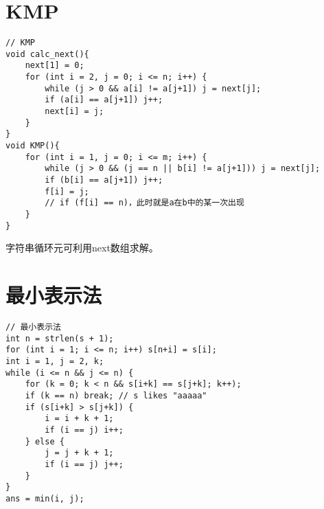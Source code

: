 \section{KMP}
\begin{lstlisting}
// KMP
void calc_next(){
    next[1] = 0;
    for (int i = 2, j = 0; i <= n; i++) {
        while (j > 0 && a[i] != a[j+1]) j = next[j];
        if (a[i] == a[j+1]) j++;
        next[i] = j;
    }
}
void KMP(){
    for (int i = 1, j = 0; i <= m; i++) {
        while (j > 0 && (j == n || b[i] != a[j+1])) j = next[j];
        if (b[i] == a[j+1]) j++;
        f[i] = j;
        // if (f[i] == n)，此时就是a在b中的某一次出现
    }
}
\end{lstlisting}
字符串循环元可利用next数组求解。
\section{最小表示法}
\begin{lstlisting}
// 最小表示法
int n = strlen(s + 1);
for (int i = 1; i <= n; i++) s[n+i] = s[i];
int i = 1, j = 2, k;
while (i <= n && j <= n) {
    for (k = 0; k < n && s[i+k] == s[j+k]; k++);
    if (k == n) break; // s likes "aaaaa"
    if (s[i+k] > s[j+k]) {
        i = i + k + 1;
        if (i == j) i++;
    } else {
        j = j + k + 1;
        if (i == j) j++;
    }
}
ans = min(i, j);
\end{lstlisting}
